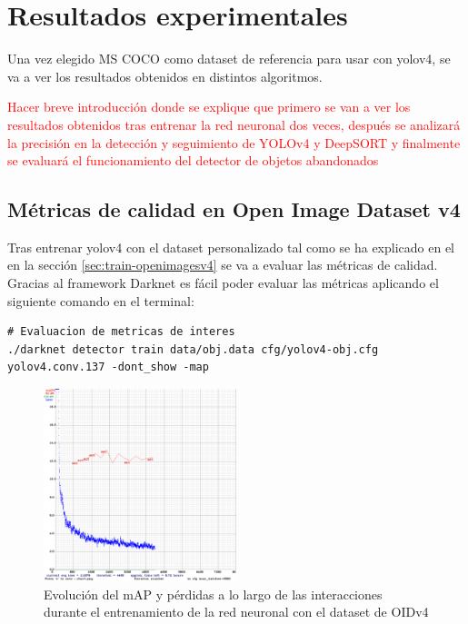 \section{Resultados experimentales}
\label{sec:resultados-experimentales}

Una vez elegido MS COCO como dataset de referencia para usar con \gls{yolov4}, se va a ver los resultados obtenidos en distintos algoritmos.

\textcolor{red}{Hacer breve introducción donde se explique que primero se van a ver los resultados obtenidos tras entrenar la red neuronal dos veces, después se analizará la precisión en la detección y seguimiento de YOLOv4 y DeepSORT y finalmente se evaluará el funcionamiento del detector de objetos abandonados}

\subsection{Métricas de calidad en Open Image Dataset v4}
\label{subsec:metricas-calidad-openimagesv4}

Tras entrenar \gls{yolov4} con el dataset personalizado tal como se ha explicado en el en la sección \ref{sec:train-openimagesv4} se va a evaluar las métricas de calidad. Gracias al framework Darknet \cite{darknet13} es fácil poder evaluar las métricas aplicando el siguiente comando en el terminal:

\vspace{0.5cm}
\begin{lstlisting}[language=iPython,caption=Evaluación métricas de calidad del dataset utilizado para el entrenamiento de la red neuronal de detección de objetos,captionpos=b,label={lst:darknet-map}]
# Evaluacion de metricas de interes
./darknet detector train data/obj.data cfg/yolov4-obj.cfg yolov4.conv.137 -dont_show -map
\end{lstlisting}

\begin{figure}[ht]
\centering
\includegraphics[width=0.5\textwidth]{img/chapters/resultados/metricas/chart_train.png}
\caption{\label{fig:chart-train}Evolución del mAP y pérdidas a lo largo de las interacciones durante el entrenamiento de la red neuronal con el dataset de OIDv4}
\end{figure}

